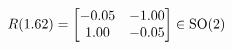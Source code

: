 \documentclass[preview]{standalone}
\begin{document}
\begin{align*}
\special{dvisvgm:raw <g id='unique000'>}R(1.62) = \begin{bmatrix} -0.05 & -1.00 \\ 1.00 & -0.05 \end{bmatrix} \in \text{SO}(2)\special{dvisvgm:raw </g>}
\end{align*}
\end{document}
